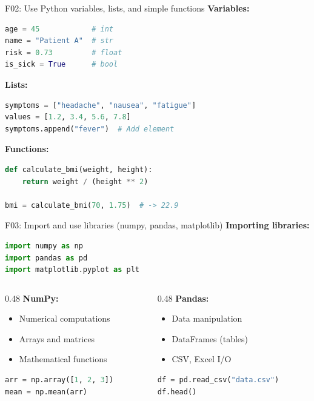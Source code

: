 \documentclass[aspectratio=169, 10pt]{beamer}
\begin{document}
\begin{frame}[fragile]{F02: Use Python variables, lists, and simple functions}
    \textbf{Variables:}
    \begin{lstlisting}[language=Python]
age = 45            # int
name = "Patient A"  # str
risk = 0.73         # float
is_sick = True      # bool
    \end{lstlisting}
    
    \textbf{Lists:}
    \begin{lstlisting}[language=Python]
symptoms = ["headache", "nausea", "fatigue"]
values = [1.2, 3.4, 5.6, 7.8]
symptoms.append("fever")  # Add element
    \end{lstlisting}
    
    \textbf{Functions:}
    \begin{lstlisting}[language=Python]
def calculate_bmi(weight, height):
    return weight / (height ** 2)

bmi = calculate_bmi(70, 1.75)  # -> 22.9
    \end{lstlisting}
\end{frame}

\begin{frame}[fragile]{F03: Import and use libraries (numpy, pandas, matplotlib)}
    \textbf{Importing libraries:}
    \begin{lstlisting}[language=Python]
import numpy as np
import pandas as pd
import matplotlib.pyplot as plt
    \end{lstlisting}
    
    \vspace{0.3cm}
    \begin{columns}[T]
        \begin{column}{0.48\textwidth}
            \textbf{NumPy:}
            \begin{itemize}
                \item Numerical computations
                \item Arrays and matrices
                \item Mathematical functions
            \end{itemize}
            \begin{lstlisting}[language=Python]
arr = np.array([1, 2, 3])
mean = np.mean(arr)
            \end{lstlisting}
        \end{column}
        \begin{column}{0.48\textwidth}
            \textbf{Pandas:}
            \begin{itemize}
                \item Data manipulation
                \item DataFrames (tables)
                \item CSV, Excel I/O
            \end{itemize}
            \begin{lstlisting}[language=Python]
df = pd.read_csv("data.csv")
df.head()
            \end{lstlisting}
        \end{column}
    \end{columns}
\end{frame}
\end{document}
